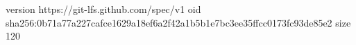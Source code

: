 version https://git-lfs.github.com/spec/v1
oid sha256:0b71a77a227cafce1629a18ef6a2f42a1b5b1e7bc3ee35ffcc0173fc93de85e2
size 120
